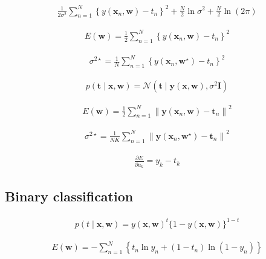 \documentclass{article}
\begin{document}
\begin{align*}
\frac{1}{2 \sigma^{2}} \sum_{n=1}^{N}\left\{y\left(\mathbf{x}_{n}, \mathbf{w}\right)-t_{n}\right\}^{2}+\frac{N}{2} \ln \sigma^{2}+\frac{N}{2} \ln (2 \pi) 
\tag{6.25}
\end{align*}

\begin{align*}
E(\mathbf{w})=\frac{1}{2} \sum_{n=1}^{N}\left\{y\left(\mathbf{x}_{n}, \mathbf{w}\right)-t_{n}\right\}^{2} 
\tag{6.26}
\end{align*}

\begin{align*}
\sigma^{2 \star}=\frac{1}{N} \sum_{n=1}^{N}\left\{y\left(\mathbf{x}_{n}, \mathbf{w}^{\star}\right)-t_{n}\right\}^{2} 
\tag{6.27}
\end{align*}

\begin{align*}
p(\mathbf{t} \mid \mathbf{x}, \mathbf{w})=\mathcal{N}\left(\mathbf{t} \mid \mathbf{y}(\mathbf{x}, \mathbf{w}), \sigma^{2} \mathbf{I}\right) 
\tag{6.28}
\end{align*}

\begin{align*}
E(\mathbf{w})=\frac{1}{2} \sum_{n=1}^{N}\left\|\mathbf{y}\left(\mathbf{x}_{n}, \mathbf{w}\right)-\mathbf{t}_{n}\right\|^{2} 
\tag{6.29}
\end{align*}

\begin{align*}
\sigma^{2 \star}=\frac{1}{N K} \sum_{n=1}^{N}\left\|\mathbf{y}\left(\mathbf{x}_{n}, \mathbf{w}^{\star}\right)-\mathbf{t}_{n}\right\|^{2} 
\tag{6.30}
\end{align*}

\begin{align*}
\frac{\partial E}{\partial a_{k}}=y_{k}-t_{k} 
\tag{6.31}
\end{align*}

\subsection{Binary classification}

\begin{align*}
p(t \mid \mathbf{x}, \mathbf{w})=y(\mathbf{x}, \mathbf{w})^{t}\{1-y(\mathbf{x}, \mathbf{w})\}^{1-t} 
\tag{6.32}
\end{align*}

\begin{align*}
E(\mathbf{w})=-\sum_{n=1}^{N}\left\{t_{n} \ln y_{n}+\left(1-t_{n}\right) \ln \left(1-y_{n}\right)\right\} 
\tag{6.33}
\end{align*}
\end{document}

